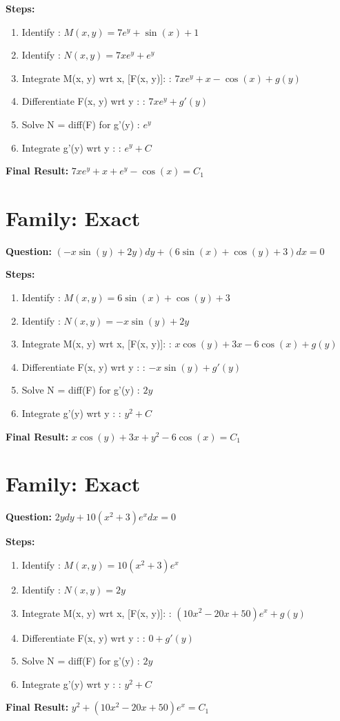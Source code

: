 \documentclass{article}
\begin{document}
\textbf{Steps:}
\begin{enumerate}
\item Identify :  $M(x, y) = 7 e^{y} + \sin{\left(x \right)} + 1$
\item Identify :  $N(x, y) = 7 x e^{y} + e^{y}$
\item Integrate M(x, y) wrt x, [F(x, y)]: :  $7 x e^{y} + x - \cos{\left(x \right)} + g(y)$
\item Differentiate F(x, y) wrt y :  :  $7 x e^{y} + g'(y)$
\item Solve N = diff(F) for g'(y) :  $e^{y}$
\item Integrate g'(y) wrt y :  :  $e^{y} + C$
\end{enumerate}
\textbf{Final Result:} $7 x e^{y} + x + e^{y} - \cos{\left(x \right)} = C_{1}$

\section*{Family: Exact}
\textbf{Question:} $\left(- x \sin{\left(y \right)} + 2 y\right) dy + \left(6 \sin{\left(x \right)} + \cos{\left(y \right)} + 3\right) dx = 0$

\textbf{Steps:}
\begin{enumerate}
\item Identify :  $M(x, y) = 6 \sin{\left(x \right)} + \cos{\left(y \right)} + 3$
\item Identify :  $N(x, y) = - x \sin{\left(y \right)} + 2 y$
\item Integrate M(x, y) wrt x, [F(x, y)]: :  $x \cos{\left(y \right)} + 3 x - 6 \cos{\left(x \right)} + g(y)$
\item Differentiate F(x, y) wrt y :  :  $- x \sin{\left(y \right)} + g'(y)$
\item Solve N = diff(F) for g'(y) :  $2 y$
\item Integrate g'(y) wrt y :  :  $y^{2} + C$
\end{enumerate}
\textbf{Final Result:} $x \cos{\left(y \right)} + 3 x + y^{2} - 6 \cos{\left(x \right)} = C_{1}$

\section*{Family: Exact}
\textbf{Question:} $2 y dy + 10 \left(x^{2} + 3\right) e^{x} dx = 0$

\textbf{Steps:}
\begin{enumerate}
\item Identify :  $M(x, y) = 10 \left(x^{2} + 3\right) e^{x}$
\item Identify :  $N(x, y) = 2 y$
\item Integrate M(x, y) wrt x, [F(x, y)]: :  $\left(10 x^{2} - 20 x + 50\right) e^{x} + g(y)$
\item Differentiate F(x, y) wrt y :  :  $0 + g'(y)$
\item Solve N = diff(F) for g'(y) :  $2 y$
\item Integrate g'(y) wrt y :  :  $y^{2} + C$
\end{enumerate}
\textbf{Final Result:} $y^{2} + \left(10 x^{2} - 20 x + 50\right) e^{x} = C_{1}$
\end{document}
